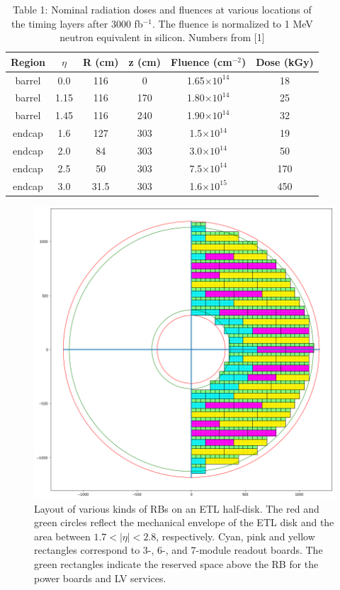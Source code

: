 \documentclass[11pt]{article}
\begin{document}
\begin{table}
  \centering
  \caption{Table 1: Nominal radiation doses and fluences at various locations of the timing layers after 3000 fb$^{-1}$. The fluence is normalized to 1 MeV neutron equivalent in silicon.
  Numbers from [1]}
  \label{table:radiationField}
  \begin{tabular}{ c c c c c c }
    Region & $\eta$ & R (cm) & z (cm) & Fluence (cm$^{-2}$) & Dose (kGy) \\
    \midrule
    barrel & 0.0    & 116    & 0      & 1.65$\times 10^{14}$ & 18         \\
    barrel & 1.15   & 116    & 170    & 1.80$\times 10^{14}$ & 25         \\
    barrel & 1.45   & 116    & 240    & 1.90$\times 10^{14}$ & 32         \\
    endcap & 1.6    & 127    & 303    & 1.5$\times 10^{14}$ & 19         \\
    endcap & 2.0    & 84     & 303    & 3.0$\times 10^{14}$ & 50         \\
    endcap & 2.5    & 50     & 303    & 7.5$\times 10^{14}$ & 170        \\
    endcap & 3.0    & 31.5   & 303    & 1.6$\times 10^{15}$ & 450        \\
  \end{tabular}
\end{table}

\begin{figure}[!h]
\centering
\includegraphics[width=\linewidth]{figures/coverage.png}
\caption{
Layout of various kinds of RBs on an ETL half-disk.
The red and green circles reflect the mechanical envelope of the ETL disk and the area between $1.7<|\eta|<2.8$, respectively.
Cyan, pink and yellow rectangles correspond to 3-, 6-, and 7-module readout boards.
The green rectangles indicate the reserved space above the RB for the power boards and LV services.
}
\label{fig:coverage}
\end{figure}
\end{document}
